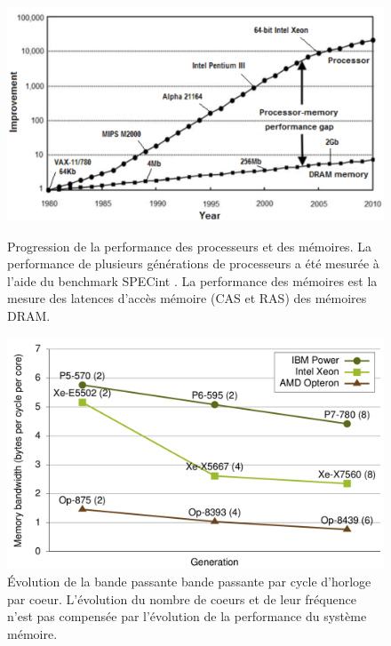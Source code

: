         \begin{figure}[ht!]
            \centering
            \includegraphics[width=14cm]{images/cpu_cpu_vs_memory.png}            \caption{\label{pic:cpuvsmemory} Progression de la performance des processeurs et des mémoires. La performance de plusieurs générations de processeurs a été mesurée à l'aide du benchmark SPECint \cite{Efnusheva2017ASO}. La performance des mémoires est la mesure des latences d’accès mémoire (CAS et RAS) des mémoires DRAM.}

            \vspace*{\floatsep}%

            \includegraphics[width=14cm]{images/cpu_bw_per_core.png}
            \caption{Évolution de la bande passante bande passante par cycle d'horloge par coeur. L'évolution du nombre de coeurs et de leur fréquence n'est pas compensée par l'évolution de la performance du système mémoire.
            \label{pic_cpu_bw_per_core}}
        \end{figure}
        

